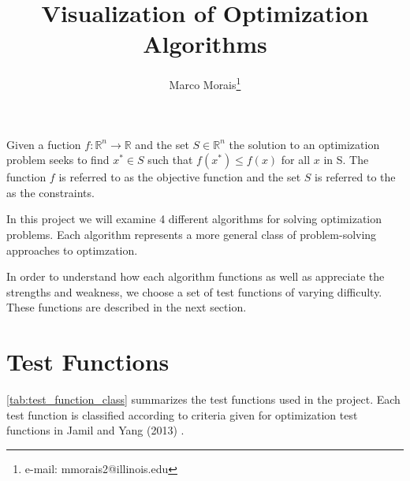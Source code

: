 \documentclass{vgtc}                          %
\title{Visualization of Optimization Algorithms}
\author{Marco Morais\thanks{e-mail: mmorais2@illinois.edu}}
\affiliation{\scriptsize UIUC}
\begin{document}


\maketitle

Given a fuction $f: \mathbb{R}^n \rightarrow \mathbb{R}$ and the set $S \in \mathbb{R}^n$ the solution to an optimization problem seeks to find $x^{*} \in S$ such that $f(x^{*}) \leq f(x)$ for all $x$ in S.  The function $f$ is referred to as the objective function and the set $S$ is referred to the as the constraints.

In this project we will examine 4 different algorithms for solving optimization problems. Each algorithm represents a more general class of problem-solving approaches to optimzation.

In order to understand how each algorithm functions as well as appreciate the strengths and weakness, we choose a set of test functions of varying difficulty. These functions are described in the next section.

\section{Test Functions}

\autoref{tab:test_function_class} summarizes the test functions used in the project. Each test function is classified according to criteria given for optimization test functions in Jamil and Yang (2013) \cite{Jamil:2013:CoRR}.
\end{document}
